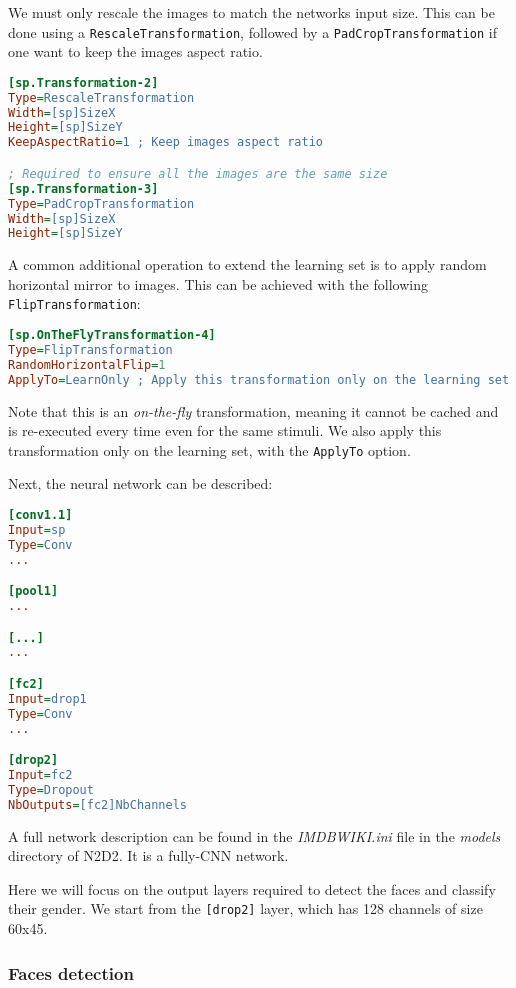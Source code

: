 \documentclass[a4paper,11pt,oneside]{article}
\begin{document}
We must only rescale the images to match the networks input size. This can be
done using a \lstinline!RescaleTransformation!, followed by a
\lstinline!PadCropTransformation! if one want to keep the images aspect ratio.

\begin{lstlisting}[language=ini]
[sp.Transformation-2]
Type=RescaleTransformation
Width=[sp]SizeX
Height=[sp]SizeY
KeepAspectRatio=1 ; Keep images aspect ratio

; Required to ensure all the images are the same size
[sp.Transformation-3]
Type=PadCropTransformation
Width=[sp]SizeX
Height=[sp]SizeY
\end{lstlisting}

A common additional operation to extend the learning set is to apply random
horizontal mirror to images. This can be achieved with the following
\lstinline!FlipTransformation!:

\begin{lstlisting}[language=ini]
[sp.OnTheFlyTransformation-4]
Type=FlipTransformation
RandomHorizontalFlip=1
ApplyTo=LearnOnly ; Apply this transformation only on the learning set
\end{lstlisting}

Note that this is an \emph{on-the-fly} transformation, meaning it cannot be
cached and is re-executed every time even for the same stimuli.
We also apply this transformation only on the learning set, with the
\lstinline!ApplyTo! option.

Next, the neural network can be described:
\begin{lstlisting}[language=ini]
[conv1.1]
Input=sp
Type=Conv
...

[pool1]
...

[...]
...

[fc2]
Input=drop1
Type=Conv
...

[drop2]
Input=fc2
Type=Dropout
NbOutputs=[fc2]NbChannels
\end{lstlisting}

A full network description can be found in the \emph{IMDBWIKI.ini} file in the
\emph{models} directory of N2D2. It is a fully-CNN network.

Here we will focus on the output layers required to detect the faces and
classify their gender. We start from the \lstinline![drop2]! layer, which has
128 channels of size 60x45.

\subsubsection{Faces detection}
\end{document}

